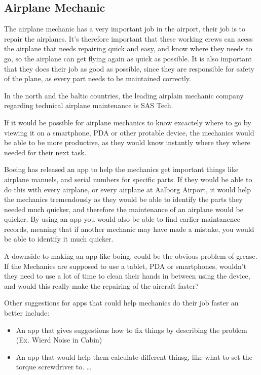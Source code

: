 \subsection{Airplane Mechanic}

The airplane mechanic has a very important job in the airport, their job is to repair the airplanes. It's therefore important that these working crews can acess the airplane that needs repairing quick and easy, and know where they needs to go, so the airplane can get flying again as quick as possible. It is also important that they does their job as good as possible, since they are responsible for safety of the plane, as every part needs to be maintained correctly.

In the north and the baltic countries, the leading airplain mechanic company regarding technical airplane maintenance is SAS Tech.\cite{sas_tech_mechanic}

If it would be possible for airplane mechanics to know excactely where to go by viewing it on a smartphone, PDA or other protable device, the mechanics would be able to be more productive, as they would know instantly where they where needed for their next task.

Boeing has released an app to help the mechanics get important things like airplane manuels, and serial numbers for specific parts. If they would be able to do this with every airplane, or every airplane at Aalborg Airport, it would help the mechanics tremendously as they would be able to identify the parts they needed much quicker, and therefore the maintenance of an airplane would be quicker. By using an app you would also be able to find earlier maintanence records, meaning that if another mechanic may have made a mistake, you would be able to identify it much quicker.\cite{cnet_boeing_app}

A downside to making an app like boing, could be the obvious problem of grease. If the Mechanics are supposed to use a tablet, PDA or smartphones, wouldn't they need to use a lot of time to clean their hands in between using the device, and would this really make the repairing of the aircraft faster?

Other suggestions for apps that could help mechanics do their job faster an better include:
\begin{itemize}
\item An app that gives suggestions how to fix things by describing the problem (Ex. Wierd Noise in Cabin)
\item An app that would help them calculate different thinsg, like what to set the torque screwdriver to. \ldots
\end{itemize}
